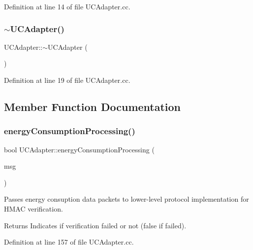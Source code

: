 Definition at line 14 of file U\+C\+Adapter.\+cc.

\mbox{\label{classUCAdapter_a5d43145233b8a18e92d258aef1d65426}} 
\subsubsection{\texorpdfstring{$\sim$\+U\+C\+Adapter()}{~UCAdapter()}}
{\footnotesize\ttfamily U\+C\+Adapter\+::$\sim$\+U\+C\+Adapter (\begin{DoxyParamCaption}{ }\end{DoxyParamCaption})}



Definition at line 19 of file U\+C\+Adapter.\+cc.



\subsection{Member Function Documentation}
\mbox{\label{classUCAdapter_a6554ae131e5cf6c059158061eb629839}} 
\subsubsection{\texorpdfstring{energy\+Consumption\+Processing()}{energyConsumptionProcessing()}}
{\footnotesize\ttfamily bool U\+C\+Adapter\+::energy\+Consumption\+Processing (\begin{DoxyParamCaption}\item[{omnetpp\+::c\+Message $\ast$}]{msg }\end{DoxyParamCaption})}

Passes energy consuption data packets to lower-\/level protocol implementation for H\+M\+AC verification. \begin{DoxyReturn}{Returns}
Indicates if verification failed or not (false if failed). 
\end{DoxyReturn}


Definition at line 157 of file U\+C\+Adapter.\+cc.



